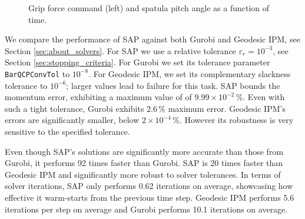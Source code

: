 \begin{figure}[!h]
	\centering
	\caption{\label{fig:slip_control_history} 
	Grip force command (left) and spatula pitch angle as a function of time.}
\end{figure}

We compare the performance of SAP against both Gurobi and Geodesic IPM, see
Section \ref{sec:about_solvers}. For SAP we use a relative tolerance
$\varepsilon_r=10^{-3}$, see Section \ref{sec:stopping_criteria}. For Gurobi we
set its tolerance parameter \verb+BarQCPConvTol+ to $10^{-8}$. For Geodesic IPM,
we set its complementary slackness tolerance to $10^{-6}$; larger values lead to
failure for this task. SAP bounds the momentum error, exhibiting a maximum value
of of $9.99\times 10^{-2}\,\%$. Even with such a tight tolerance, Gurobi
exhibits $2.6\,\%$ maximum error. Geodesic IPM's errors are significantly
smaller, below $2\times 10^{-4}\,\%$. However its robustness is very sensitive
to the specified tolerance.

Even though SAP's solutions are significantly more accurate than those from
Gurobi, it performs 92 times faster than Gurobi. SAP is 20 times faster than
Geodesic IPM and significantly more robust to solver tolerances. In terms of
solver iterations, SAP only performs 0.62 iterations on average, showcasing how
effective it warm-starts from the previous time step. Geodesic IPM performs 5.6
iterations per step on average and Gurobi performs 10.1 iterations on average.
